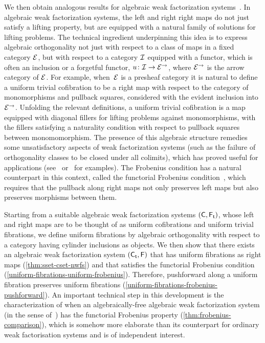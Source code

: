 \documentclass[reqno,10pt,a4paper,oneside,draft]{amsart}
\begin{document}
We then obtain analogous results for algebraic weak factorization systems~\cite{garner:small-object-argument,grandis-tholen-nwfs}. In algebraic weak factorization systems, the 
left and right right maps do not just satisfy a lifting property, but are equipped with a natural family of solutions for lifting problems. The technical ingredient underpinning this idea is to
express algebraic orthogonality not just with respect to a class of maps in a fixed category $\cal{E}$, but with respect to a category $\cal{I}$ equipped with a functor, which 
is often an inclusion or a forgetful functor, $u \co \cal{I} \to \cal{E}^\to$, where $\cal{E}^\to$ is the arrow category of $\cal{E}$. For example, when~$\cal{E}$ is a presheaf category it is natural to define a uniform trivial cofibration to be a right map with respect to the category of monomorphisms and  pullback squares, considered with the evident inclusion into $\cal{E}^\to$. Unfolding the relevant definitions, a uniform trivial cofibration is a map equipped with diagonal fillers for lifting problems against monomorphisms, with the fillers  satisfying  a naturality condition with respect to pullback squares between monomomorphism. 
The presence of this algebraic structure remedies some unsatisfactory aspects of weak factorization systems (such as the failure of orthogonality classes to be closed under all colimits), which
has proved useful for applications (see~\cite{batanin-cisinski-weber,garner:globular-operator-awfs,garner-homomorphisms} or~\cite{awodey-cubical,coquand-cubical-sets,cohen-et-al:cubicaltt,pitts-cubical-nominal,swan-awfs} for examples). The Frobenius condition has a natural counterpart in this context, called the functorial Frobenius condition~\cite{garner:topological-simplicial}, which requires that the pullback along right maps not only preserves left maps but also preserves morphisms between them.  





Starting from a suitable algebraic weak factorization systems $(\CC, \TF)$, whose left and right maps are to be thought of as uniform cofibrations and uniform trivial fibrations, we define uniform fibrations by algebraic orthogonality with respect to a category having cylinder inclusions as objects. We then show that there exists an algebraic weak factorization system $(\TC, \FF)$ that has uniform fibrations as right maps (\cref{thm:sset-cset-nwfs}) and that satisfies the functorial Frobenius condition (\cref{uniform-fibrations-uniform-frobenius}). 
Therefore, pushforward along a uniform  fibration preserves uniform  fibrations (\cref{uniform-fibrations-frobenius-pushforward}). An important technical step in this development is
the characterization of when an algebraically-free algebraic weak factorization system (in the sense of~\cite{garner:small-object-argument}) has the functorial Frobenius property (\cref{thm:frobenius-comparison}), which is somehow more
elaborate than its counterpart for ordinary weak factorisation systems and is of independent interest. 
\end{document}

